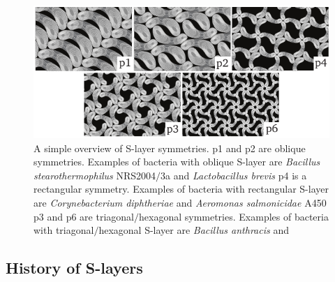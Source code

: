         \begin{figure}[htb] %
            \begin{center}
                \includegraphics[]{intro/img/symmetries.pdf}
            \end{center}
            \caption[A simple overview of \ac{S-layer} symmetries]{A simple overview of \ac{S-layer} symmetries. p1 and p2 are oblique symmetries. Examples of bacteria with oblique \acs{S-layer} are \textit{Bacillus stearothermophilus} NRS2004$/$3a and \textit{Lactobacillus brevis}
            p4 is a rectangular symmetry.  Examples of bacteria with rectangular \acs{S-layer} are \textit{Corynebacterium diphtheriae} and \textit{Aeromonas salmonicidae} A450
            p3 and p6 are triagonal$/$hexagonal symmetries.  Examples of bacteria with triagonal$/$hexagonal \acs{S-layer} are \textit{Bacillus anthracis} and \caulobacter{}
            }
            \label{fig:symmetries}
        \end{figure}

    \subsection{History of S-layers} %
    \label{sub:history_of_s_layers}
       




